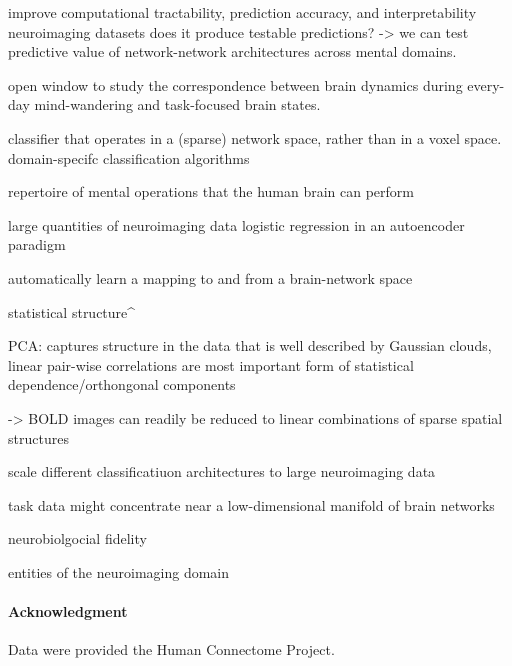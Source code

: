 \documentclass{article} %
\begin{document}
improve computational tractability, prediction accuracy, and interpretability
neuroimaging datasets
does it produce testable predictions?
-> we can test predictive value of network-network architectures across
mental domains.

open window to study the correspondence between brain dynamics during
every-day mind-wandering and task-focused brain states.

classifier that operates in a (sparse) network space, rather than in a voxel space.
domain-specifc classification algorithms

repertoire of mental operations that the human brain can perform

large quantities of neuroimaging data
logistic regression in an autoencoder paradigm

automatically learn a mapping to and from a brain-network space

statistical structure^

PCA:
captures structure in the data that is well described by Gaussian clouds,
linear pair-wise correlations are most important form of statistical
dependence/orthongonal components

-> BOLD images can readily be reduced to linear combinations of
sparse spatial structures

scale different classificatiuon architectures to large neuroimaging data

task data might concentrate near a low-dimensional manifold of brain networks

neurobiolgocial fidelity

entities of the neuroimaging domain

%
\paragraph{Acknowledgment}
{\small
Data were provided the Human Connectome Project.
}


\small


\end{document}
